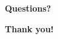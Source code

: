 %
%
%
\begin{frame}
  \begin{center}
  \Huge
  \textbf{Questions?}
  \end{center}
\end{frame}

\begin{frame}
  \begin{center}
  \Huge
  \textbf{Thank you!}
  \end{center}
\end{frame}
